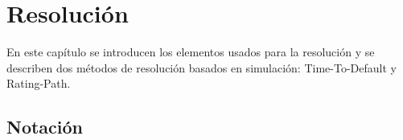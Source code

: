 
%
%
%
%
%
%
%
%

\chapter{Resoluci\'on}
\label{sec:resolution}

En este cap\'itulo se introducen los elementos usados para la resoluci\'on y
se describen dos m\'etodos de resoluci\'on basados en simulaci\'on:
Time-To-Default y Rating-Path.


\section{Notaci\'on}

